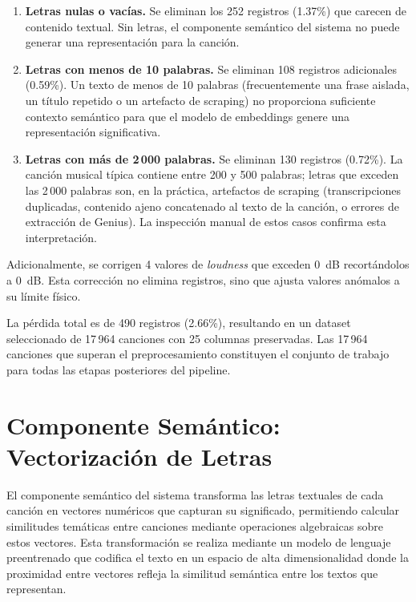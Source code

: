 \begin{enumerate}[leftmargin=2em]
    \item \textbf{Letras nulas o vacías.} Se eliminan los 252 registros (1.37\%) que carecen de contenido textual. Sin letras, el componente semántico del sistema no puede generar una representación para la canción.

    \item \textbf{Letras con menos de 10 palabras.} Se eliminan 108 registros adicionales (0.59\%). Un texto de menos de 10 palabras (frecuentemente una frase aislada, un título repetido o un artefacto de scraping) no proporciona suficiente contexto semántico para que el modelo de embeddings genere una representación significativa.

    \item \textbf{Letras con más de 2\,000 palabras.} Se eliminan 130 registros (0.72\%). La canción musical típica contiene entre 200 y 500 palabras; letras que exceden las 2\,000 palabras son, en la práctica, artefactos de scraping (transcripciones duplicadas, contenido ajeno concatenado al texto de la canción, o errores de extracción de Genius). La inspección manual de estos casos confirma esta interpretación.
\end{enumerate}

Adicionalmente, se corrigen 4 valores de \textit{loudness} que exceden 0~dB recortándolos a 0~dB. Esta corrección no elimina registros, sino que ajusta valores anómalos a su límite físico.

La pérdida total es de 490 registros (2.66\%), resultando en un dataset seleccionado de 17\,964 canciones con 25 columnas preservadas. Las 17\,964 canciones que superan el preprocesamiento constituyen el conjunto de trabajo para todas las etapas posteriores del pipeline.

\section{Componente Semántico: Vectorización de Letras}
\label{sec:componente-semantico}

El componente semántico del sistema transforma las letras textuales de cada canción en vectores numéricos que capturan su significado, permitiendo calcular similitudes temáticas entre canciones mediante operaciones algebraicas sobre estos vectores. Esta transformación se realiza mediante un modelo de lenguaje preentrenado que codifica el texto en un espacio de alta dimensionalidad donde la proximidad entre vectores refleja la similitud semántica entre los textos que representan.

